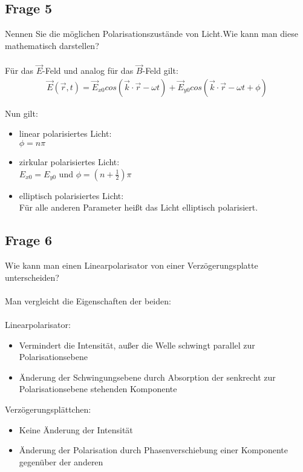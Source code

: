 \documentclass[a4paper,10pt]{scrartcl}
\begin{document}
		\subsection{Frage 5}
			Nennen Sie die möglichen Polarisationszustände von Licht.Wie kann man diese mathematisch
			darstellen?\\
			\\
			Für das \(\vec{E}\)-Feld und analog für das \(\vec{B}\)-Feld gilt:
			\begin{align*}
			\vec{E}(\vec{r},t)=\vec{E}_{x0}cos(\vec{k}\cdot\vec{r}-\omega t)+\vec{E}_{y0}cos(\vec{k}\cdot\vec{r}-\omega t+\phi)
			\end{align*}
			
			\newpage
			
			Nun gilt:
			
			\begin{itemize}
				\item linear polarisiertes Licht:\\
				\(\phi=n\pi\)
				\item zirkular polarisiertes Licht:\\
				\(E_{x0}=E_{y0}\) und \(\phi=(n+\frac{1}{2})\pi\)
				\item elliptisch polarisiertes Licht:\\
				Für alle anderen Parameter heißt das Licht elliptisch polarisiert.
			\end{itemize}
		
		\subsection{Frage 6}
			Wie kann man einen Linearpolarisator von einer Verzögerungsplatte unterscheiden?\\
			\\
			Man vergleicht die Eigenschaften der beiden:\\
			\\
			Linearpolarisator:
			
			\begin{itemize}
				\item Vermindert die Intensität, außer die Welle schwingt parallel zur Polarisationsebene
				\item Änderung der Schwingungsebene durch Absorption der senkrecht zur Polarisationsebene stehenden Komponente
			\end{itemize}
		
			Verzögerungsplättchen:
			
			\begin{itemize}
				\item Keine Änderung der Intensität
				\item Änderung der Polarisation durch Phasenverschiebung einer Komponente gegenüber der anderen
			\end{itemize}
		
\end{document}
